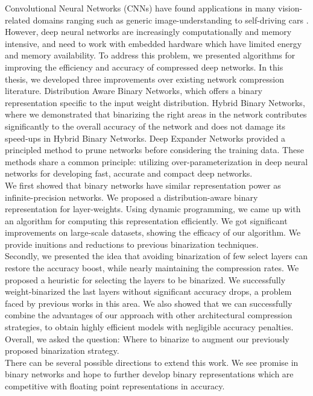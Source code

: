 \noindent Convolutional Neural Networks (CNNs) have found applications in many vision-related domains ranging such as generic image-understanding to self-driving cars \cite{bojarski2016end}. However, deep neural networks are increasingly computationally and memory intensive, and need to work with embedded hardware which have limited energy and memory availability. To address this problem, we presented algorithms for improving the efficiency and accuracy of compressed deep networks. In this thesis, we developed three improvements over existing network compression literature. Distribution Aware Binary Networks, which offers a binary representation specific to the input weight distribution. Hybrid Binary Networks, where we demonstrated that binarizing the right areas in the network contributes significantly to the overall accuracy of the network and does not damage its speed-ups in Hybrid Binary Networks. Deep Expander Networks provided a principled method to prune networks before considering the training data. These methods share a common principle: utilizing over-parameterization in deep neural networks for developing fast, accurate and compact deep networks.\\

\noindent We first showed that binary networks have similar representation power as infinite-precision networks. We proposed a distribution-aware binary representation for layer-weights. Using dynamic programming, we came up with an algorithm for computing this representation efficiently. We got significant improvements on large-scale datasets, showing the efficacy of our algorithm. We provide inuitions and reductions to previous binarization techniques.\\

\noindent Secondly, we presented the idea that avoiding binarization of few select layers can restore the accuracy boost, while nearly maintaining the compression rates. We proposed a heuristic for selecting the layers to be binarized. We successfully weight-binarized the last layers without significant accuracy drops, a problem faced by previous works in this area.  We also showed that we can successfully combine  the  advantages  of  our  approach  with  other  architectural compression strategies, to obtain highly efficient models with negligible accuracy penalties. Overall, we asked the question: Where to binarize to augment our previously proposed binarization strategy.\\

\noindent There can be several possible directions to extend this work. We see promise in binary networks and hope to further develop binary representations which are competitive with floating point representations in accuracy.\\ 

